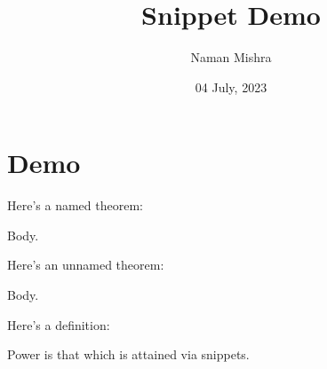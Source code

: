 \documentclass[12pt]{article}
\title{Snippet Demo}
\author{Naman Mishra}
\date{04 July, 2023}
\begin{document}
\maketitle

\section{Demo} \label{sec:demo}

Here's a named theorem:
\begin{theorem} \label{thm:demo:named_theorem}
    Body.
\end{theorem}
Here's an unnamed theorem:
\begin{theorem} \label{thm:demo:unnamed_theorem}
    Body.
\end{theorem}
Here's a definition:
\begin{definition}[Power] \label{def:demo:snippets:power}
    Power is that which is attained via snippets.
\end{definition}
\end{document}
